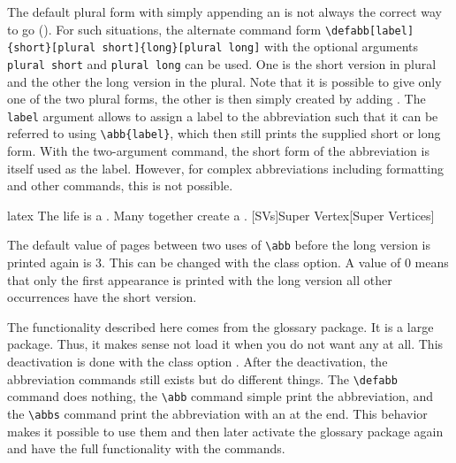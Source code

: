 The default plural form with simply appending an  is not always the
correct way to go (). For such situations, the alternate command form
\verb|\defabb[label]{short}[plural short]{long}[plural long]|
with the optional arguments \verb|plural short| and \verb|plural long| can be
used.  One is the short version in plural and the other the long version in
the plural. Note that it is possible to give only one of the two plural forms,
the other is then simply created by adding . The \verb|label| argument
allows to assign a label to the abbreviation such that it can be referred to
using \verb|\abb{label}|, which then still prints the supplied
short or long form.  With the two-argument command, the short form of the
abbreviation is itself used as the label. However, for complex abbreviations
including formatting and other commands, this is not possible.

\begin{algorithm}
    \label{alg:abb}
    \begin{code}{latex}
The life is a .
Many  together create a .
[SVs]{Super Vertex}[Super Vertices]
    \end{code}
\end{algorithm}

The default value of pages between two uses of \verb!\abb! before the long
version is printed again is 3. This can be changed with the 
class option. A value of 0 means that only the first
appearance is printed with the long version all other occurrences have the
short version.

The functionality described here comes from the glossary package. It is a
large package. Thus, it makes sense not load it when you do not want any
 at all. This deactivation is done with the class
option . After the deactivation,
the abbreviation commands still exists but do different things. The
\verb!\defabb! command does nothing, the \verb!\abb! command simple print the
abbreviation, and the \verb!\abbs! command print the abbreviation with an
 at the end. This behavior makes it possible to use them and then later
activate the glossary package again and have the full functionality with the
commands.


